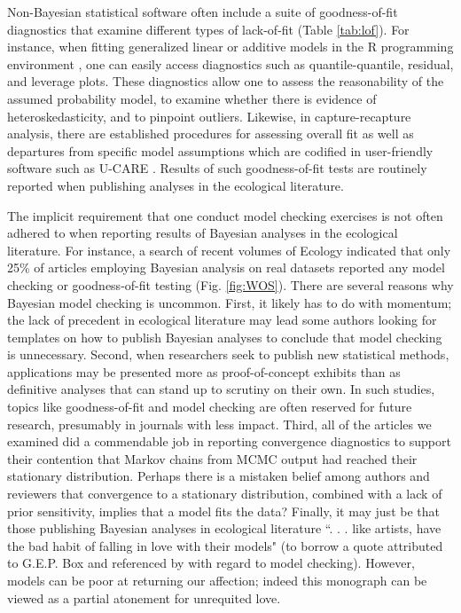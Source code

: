 \documentclass[12pt,english]{article}
\begin{document}
\begin{spacing}{1.9}
Non-Bayesian statistical software often include a suite of
goodness-of-fit diagnostics that examine different types of
lack-of-fit (Table \ref{tab:lof}).  For instance, when fitting
generalized linear \citep{McCullaghNelder1989} or additive
\citep{Wood2006} models in the R programming environment
\citep{RTeam2015}, one can easily access diagnostics such as
quantile-quantile, residual, and leverage plots.  These diagnostics
allow one to assess the reasonability of the assumed probability
model, to examine whether there is evidence of heteroskedasticity, and
to pinpoint outliers.  Likewise, in capture-recapture analysis, there
are established procedures for assessing overall fit as well as
departures from specific model assumptions which are codified in
user-friendly software such as U-CARE \citep{ChoquetEtAl2009}.
Results of such goodness-of-fit tests are routinely reported when
publishing analyses in the ecological literature.

The implicit requirement that one conduct model checking exercises is
not often adhered to when reporting results of Bayesian analyses in
the ecological literature.  For instance, a search of recent volumes
of Ecology indicated that only 25\% of articles employing Bayesian
analysis on real datasets reported any model checking or
goodness-of-fit testing (Fig. \ref{fig:WOS}).  There are several
reasons why Bayesian model checking is uncommon.  First, it likely has
to do with momentum; the lack of precedent in ecological literature
may lead some authors looking for templates on how to publish Bayesian
analyses to conclude that model checking is unnecessary.  Second, when
researchers seek to publish new statistical methods, applications may
be presented more as proof-of-concept exhibits than as definitive
analyses that can stand up to scrutiny on their own. In such studies,
topics like goodness-of-fit and model checking are often reserved for
future research, presumably in journals with less impact.  Third, all
of the articles we examined did a commendable job in reporting
convergence diagnostics to support their contention that Markov chains
from MCMC output had reached their stationary distribution.  Perhaps
there is a mistaken belief among authors and reviewers that
convergence to a stationary distribution, combined with a lack of
prior sensitivity, implies that a model fits the data?  Finally, it
may just be that those publishing Bayesian analyses in ecological
literature ``. . . like artists, have the bad habit of falling in love
with their models" (to borrow a quote attributed to G.E.P. Box and
referenced by \citet{LinkBarker2010} with regard to model checking).
However, models can be poor at returning our affection; indeed this
monograph can be viewed as a partial atonement for unrequited love.


\end{spacing}
\end{document}

